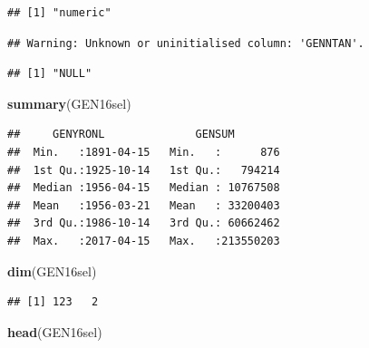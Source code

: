 \documentclass[12pt,]{article}
\newenvironment{Shaded}{\begin{snugshade}}{\end{snugshade}}
\newcommand{\KeywordTok}[1]{\textcolor[rgb]{0.13,0.29,0.53}{\textbf{#1}}}
\newcommand{\OperatorTok}[1]{\textcolor[rgb]{0.81,0.36,0.00}{\textbf{#1}}}
\newcommand{\NormalTok}[1]{#1}
\begin{document}
\begin{Shaded}
\end{Shaded}

\begin{verbatim}
## [1] "numeric"
\end{verbatim}

\begin{Shaded}
\end{Shaded}

\begin{verbatim}
## Warning: Unknown or uninitialised column: 'GENNTAN'.
\end{verbatim}

\begin{verbatim}
## [1] "NULL"
\end{verbatim}

\begin{Shaded}
\begin{Highlighting}[]
\KeywordTok{summary}\NormalTok{(GEN16sel)}
\end{Highlighting}
\end{Shaded}

\begin{verbatim}
##     GENYRONL              GENSUM         
##  Min.   :1891-04-15   Min.   :      876  
##  1st Qu.:1925-10-14   1st Qu.:   794214  
##  Median :1956-04-15   Median : 10767508  
##  Mean   :1956-03-21   Mean   : 33200403  
##  3rd Qu.:1986-10-14   3rd Qu.: 60662462  
##  Max.   :2017-04-15   Max.   :213550203
\end{verbatim}

\begin{Shaded}
\begin{Highlighting}[]
\KeywordTok{dim}\NormalTok{(GEN16sel)}
\end{Highlighting}
\end{Shaded}

\begin{verbatim}
## [1] 123   2
\end{verbatim}

\begin{Shaded}
\begin{Highlighting}[]
\KeywordTok{head}\NormalTok{(GEN16sel)}
\end{Highlighting}
\end{Shaded}
\end{document}

